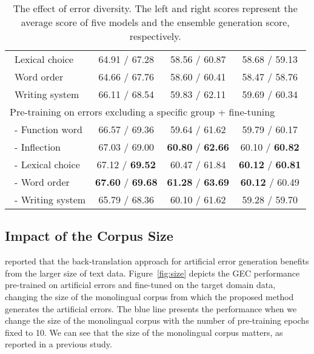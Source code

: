 \documentclass[11pt]{article}
\begin{document}
\begin{table}[t]
\begin{tabular}{lccc}
		\\
		\ Lexical choice
		& 64.91 / 67.28
		& 58.56 / 60.87
		& 58.68 / 59.13
		\\
		\ Word order
		& 64.66 / 67.76
		& 58.60 / 60.41
		& 58.47 / 58.76
		\\
		\ Writing system
		& 66.11 / 68.54
		& 59.83 / 62.11
		& 59.69 / 60.34
		\\
		\hline
		\multicolumn{4}{l}{Pre-training on errors excluding a specific group + fine-tuning}
		\\
		\ - Function word
		& 66.57 / 69.36
		& 59.64 / 61.62
		& 59.79 / 60.17
		\\
		\ - Inflection
		& 67.03 / 69.00
		& \textbf{60.80} / \textbf{62.66}
		& 60.10 / \textbf{60.82}
		\\
		\ - Lexical choice
		& 67.12 / \textbf{69.52}
		& 60.47 / 61.84
		& \textbf{60.12} / \textbf{60.81}
		\\
		\ - Word order
		& \textbf{67.60} / \textbf{69.68}
		& \textbf{61.28} / \textbf{63.69}
		& \textbf{60.12} / 60.49
		\\
		\ - Writing system
		& 65.79 / 68.36
		& 60.10 / 61.62
		& 59.28 / 59.70
		\\
		\hline
	\end{tabular}
	\caption{The effect of error diversity.
		The left and right scores represent the average score of five models and the ensemble generation score, respectively.}
	\label{tab:abl}
\end{table}

\subsection{Impact of the Corpus Size}

\citet{kiyono-etal-2019-empirical} reported that the back-translation approach for artificial error generation benefits from the larger size of text data.
Figure~\ref{fig:size} depicts the GEC performance pre-trained on artificial errors and fine-tuned on the target domain data,
changing the size of the monolingual corpus from which the proposed method generates the artificial errors.
The blue line presents the performance when we change the size of the monolingual corpus with the number of pre-training epochs fixed to 10.
We can see that the size of the monolingual corpus matters, as reported in a previous study.
\end{document}
